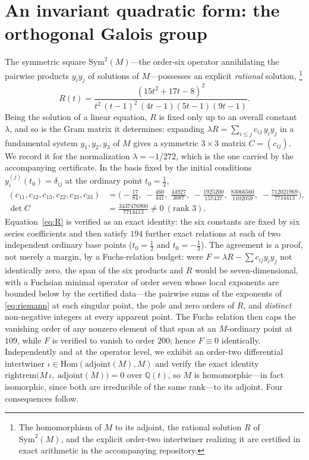 \documentclass[cntp]{ipart}
\theoremstyle{plain}
\theoremstyle{remark}
\begin{document}
\section{An invariant quadratic form: the orthogonal Galois group}
\label{sec:orthogonal}
The symmetric square $\mathrm{Sym}^2(M)$---the order-six operator annihilating the pairwise products $y_iy_j$ of
solutions of $M$---possesses an explicit \emph{rational} solution,%
\footnote{The homomorphism of $M$ to its adjoint, the rational solution $R$ of $\mathrm{Sym}^2(M)$, and the
explicit order-two intertwiner realizing it are certified in exact arithmetic in the accompanying repository.}
\begin{equation}
R(t)=\frac{(15t^2+17t-8)^2}{t^2\,(t-1)^2\,(4t-1)(5t-1)(9t-1)}.
\label{eq:R}
\end{equation}
Being the solution of a linear equation, $R$ is fixed only up to an overall constant $\lambda$, and so is the
Gram matrix it determines: expanding $\lambda R=\sum_{i\le j}c_{ij}\,y_iy_j$ in a fundamental system
$y_1,y_2,y_3$ of $M$ gives a symmetric $3\times3$ matrix $C=(c_{ij})$. We record it for the normalization
$\lambda=-1/272$, which is the one carried by the accompanying certificate. In the basis fixed by the initial
conditions $y_i^{(j)}(t_0)=\delta_{ij}$ at the ordinary point $t_0=\tfrac12$,
{\small
\begin{equation}
\begin{split}
(c_{11},c_{12},c_{13},c_{22},c_{23},c_{33})&=
\Big(-\tfrac{17}{84},\;-\tfrac{460}{441},\;\tfrac{44927}{3087},\;
-\tfrac{1925200}{157437},\;\tfrac{83066560}{1102059},\;-\tfrac{712021969}{7714413}\Big),\\[2pt]
\det C&=\tfrac{3437476900}{7714413}\neq0\ (\text{rank }3).
\end{split}
\end{equation}}
Equation~\eqref{eq:R} is verified as an exact identity:
the six constants are fixed by six series coefficients and then satisfy $194$ further exact relations at
each of two independent ordinary base points ($t_0=\tfrac12$ and $t_0=-\tfrac13$). The agreement is a proof, not
merely a margin, by a Fuchs-relation budget: were $F=\lambda R-\sum c_{ij}y_iy_j$ not identically zero, the span of the six
products and $R$ would be seven-dimensional, with a Fuchsian minimal operator of order seven whose local exponents
are bounded below by the certified data---the pairwise sums of the exponents of \eqref{eq:riemann} at each singular
point, the pole and zero orders of $R$, and \emph{distinct} non-negative integers at every apparent point. The
Fuchs relation then caps the vanishing order of any nonzero element of that span at an $M$-ordinary point at
$109$, while $F$ is verified to vanish to order $200$; hence $F\equiv0$ identically. Independently and at the operator level,
we exhibit an order-two differential intertwiner $\iota\in\mathrm{Hom}(\mathrm{adjoint}(M),M)$ and verify the exact
identity $\mathrm{rightrem}\big(M\,\iota,\ \mathrm{adjoint}(M)\big)=0$ over $\mathbb{Q}(t)$, so $M$ is homomorphic---in
fact isomorphic, since both are irreducible of the same rank---to its adjoint. Four consequences follow.
\end{document}
